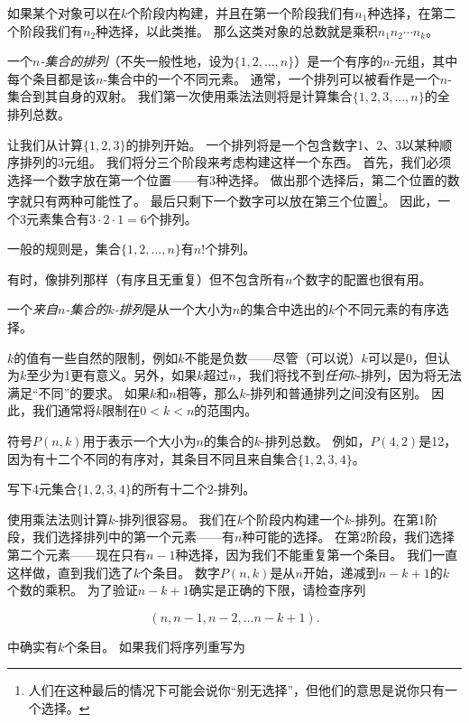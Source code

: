 如果某个对象可以在$k$个阶段内构建，并且在第一个阶段我们有$n_1$种选择，在第二个阶段我们有$n_2$种选择，以此类推。
那么这类对象的总数就是乘积$n_1n_2 \cdots n_k$。

一个\emph{$n$-集合的排列}（不失一般性地，设为$\{1,2,\ldots , n\}$）是一个有序的$n$-元组，其中每个条目都是该$n$-集合中的一个不同元素。
通常，一个排列可以被看作是一个$n$-集合到其自身的双射。
我们第一次使用乘法法则将是计算集合$\{1, 2, 3, \ldots ,n\}$的全排列总数。

让我们从计算$\{1, 2, 3\}$的排列开始。
一个排列将是一个包含数字1、2、3以某种顺序排列的3元组。
我们将分三个阶段来考虑构建这样一个东西。
首先，我们必须选择一个数字放在第一个位置——有3种选择。
做出那个选择后，第二个位置的数字就只有两种可能性了。
最后只剩下一个数字可以放在第三个位置\footnote{人们在这种最后的情况下可能会说你“别无选择”，但他们的意思是说你只有一个选择。}。
因此，一个3元素集合有$3\cdot 2\cdot 1 = 6$个排列。

一般的规则是，集合$\{1, 2, \ldots , n\}$有$n!$个排列。

有时，像排列那样（有序且无重复）但不包含所有$n$个数字的配置也很有用。

\begin{defi}
一个\emph{来自$n$-集合的$k$-排列}是从一个大小为$n$的集合中选出的$k$个不同元素的有序选择。
\end{defi}

$k$的值有一些自然的限制，例如$k$不能是负数——尽管（可以说）$k$可以是0，但认为$k$至少为1更有意义。另外，如果$k$超过$n$，我们将找不到\emph{任何}$k$-排列，因为将无法满足“不同”的要求。
如果$k$和$n$相等，那么$k$-排列和普通排列之间没有区别。
因此，我们通常将$k$限制在$0 < k < n$的范围内。

符号$P(n,k)$用于表示一个大小为$n$的集合的$k$-排列总数。
例如，$P(4,2)$是12，因为有十二个不同的有序对，其条目不同且来自集合$\{1,2,3,4\}$。

\begin{exer}
写下4元集合$\{1,2,3,4\}$的所有十二个2-排列。
\end{exer}

使用乘法法则计算$k$-排列很容易。
我们在$k$个阶段内构建一个$k$-排列。在第1阶段，我们选择排列中的第一个元素——有$n$种可能的选择。
在第2阶段，我们选择第二个元素——现在只有$n-1$种选择，因为我们不能重复第一个条目。
我们一直这样做，直到我们选了$k$个条目。
数字$P(n,k)$是从$n$开始，递减到$n-k+1$的$k$个数的乘积。
为了验证$n-k+1$确实是正确的下限，请检查序列

\[ (n, n-1, n-2, \ldots n-k+1). \]

中确实有$k$个条目。
如果我们将序列重写为

